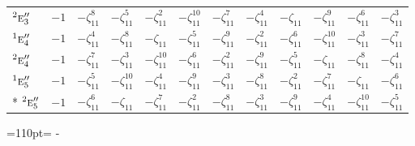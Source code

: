 \documentclass[10pt,a4paper]{article}
\newcommand{\needspace}[1]{\par\penalty-100\begingroup\dimen0=#1\relax\dimen2=\pagegoal
  \advance\dimen2-\pagetotal\ifdim\dimen0>\dimen2\relax\ifdim\dimen2>0pt\vfil\break\fi\fi
  \endgroup}
\numberwithin{equation}{section}
\newcommand{\irr}[1]{\text{\normalfont\scshape #1}}
\newcommand{\conjpair}[1]{{}^{#1}}
\newcommand{\rootunity}[1]{\zeta_{#1}}
\begin{document}
{\begin{longtable}{@{}lccccccccccc@{}}
$\conjpair{2}\irr{e}_{3}''$ & $-1$ & $-\rootunity{11}^{8}$ & $-\rootunity{11}^{5}$ & $-\rootunity{11}^{2}$ & $-\rootunity{11}^{10}$ & $-\rootunity{11}^{7}$ & $-\rootunity{11}^{4}$ & $-\rootunity{11}$ & $-\rootunity{11}^{9}$ & $-\rootunity{11}^{6}$ & $-\rootunity{11}^{3}$\\
$\conjpair{1}\irr{e}_{4}''$ & $-1$ & $-\rootunity{11}^{4}$ & $-\rootunity{11}^{8}$ & $-\rootunity{11}$ & $-\rootunity{11}^{5}$ & $-\rootunity{11}^{9}$ & $-\rootunity{11}^{2}$ & $-\rootunity{11}^{6}$ & $-\rootunity{11}^{10}$ & $-\rootunity{11}^{3}$ & $-\rootunity{11}^{7}$\\
$\conjpair{2}\irr{e}_{4}''$ & $-1$ & $-\rootunity{11}^{7}$ & $-\rootunity{11}^{3}$ & $-\rootunity{11}^{10}$ & $-\rootunity{11}^{6}$ & $-\rootunity{11}^{2}$ & $-\rootunity{11}^{9}$ & $-\rootunity{11}^{5}$ & $-\rootunity{11}$ & $-\rootunity{11}^{8}$ & $-\rootunity{11}^{4}$\\
$\conjpair{1}\irr{e}_{5}''$ & $-1$ & $-\rootunity{11}^{5}$ & $-\rootunity{11}^{10}$ & $-\rootunity{11}^{4}$ & $-\rootunity{11}^{9}$ & $-\rootunity{11}^{3}$ & $-\rootunity{11}^{8}$ & $-\rootunity{11}^{2}$ & $-\rootunity{11}^{7}$ & $-\rootunity{11}$ & $-\rootunity{11}^{6}$\\*
$\conjpair{2}\irr{e}_{5}''$ & $-1$ & $-\rootunity{11}^{6}$ & $-\rootunity{11}$ & $-\rootunity{11}^{7}$ & $-\rootunity{11}^{2}$ & $-\rootunity{11}^{8}$ & $-\rootunity{11}^{3}$ & $-\rootunity{11}^{9}$ & $-\rootunity{11}^{4}$ & $-\rootunity{11}^{10}$ & $-\rootunity{11}^{5}$\\
\bottomrule\end{longtable}}
\needspace{110pt}
\end{document}
